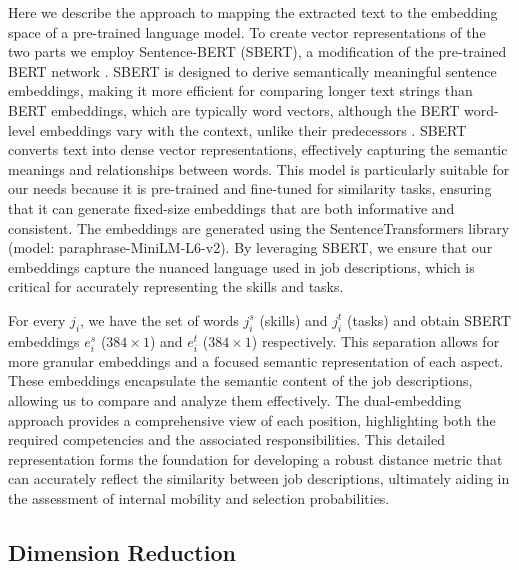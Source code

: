 Here we describe the approach to mapping the extracted text to the embedding space of a pre-trained language model. 
To create vector representations of the two parts we employ Sentence-BERT (SBERT), a modification of the pre-trained 
BERT network \autocite{devlin2018bert}. SBERT is designed to derive semantically meaningful sentence embeddings, making 
it more efficient for comparing longer text strings than BERT embeddings, which are typically word vectors, although 
the BERT word-level embeddings vary with the context, unlike their predecessors \autocite{reimers-2019-sentence-bert}. 
SBERT converts text into dense vector representations, effectively capturing the semantic meanings and relationships 
between words. This model is particularly suitable for our needs because it is pre-trained and fine-tuned for 
similarity tasks, ensuring that it can generate fixed-size embeddings that are both informative and consistent. 
The embeddings are generated using the SentenceTransformers library (model: paraphrase-MiniLM-L6-v2). By leveraging 
SBERT, we ensure that our embeddings capture the nuanced language used in job descriptions, which is critical for 
accurately representing the skills and tasks. 

For every $j_i$, we have the set of words $j_i^s$ (skills) and $j_i^t$ (tasks) and obtain SBERT embeddings 
$e_i^s$ ($384 \times 1$) and $e_i^t$ ($384 \times 1$) respectively. This separation allows for more granular 
embeddings and a focused semantic representation of each aspect. These embeddings encapsulate the semantic content 
of the job descriptions, allowing us to compare and analyze them effectively. The dual-embedding approach provides 
a comprehensive view of each position, highlighting both the required competencies and the associated responsibilities. 
This detailed representation forms the foundation for developing a robust distance metric that can accurately reflect 
the similarity between job descriptions, ultimately aiding in the assessment of internal mobility and selection probabilities.  

\subsection{Dimension Reduction}

